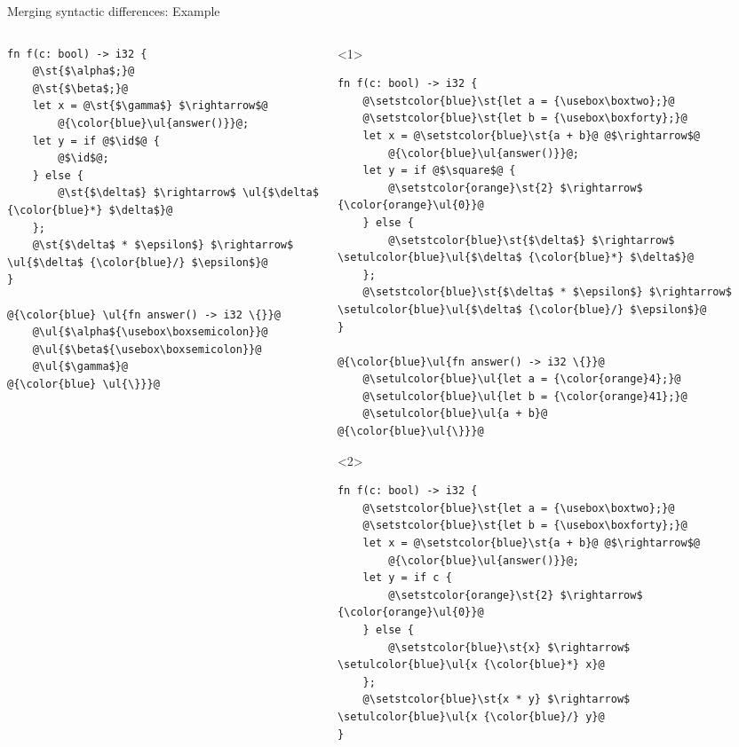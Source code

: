 \documentclass{beamer}
\makeatletter
\let\UL\ul
\renewcommand\ul{%
  \let\set@color\beamerorig@set@color
  \let\reset@color\beamerorig@reset@color
  \UL}
\let\ST\st
\renewcommand\st{%
  \let\set@color\beamerorig@set@color
  \let\reset@color\beamerorig@reset@color
  \ST}
\newcommand\id{\square}
\makeatother
\begin{document}
\begin{frame}[fragile]{Merging syntactic differences: Example}
\begin{columns}
\begin{column}{0.33\textwidth}
\newbox\boxsemicolon
\sbox\boxsemicolon{\color{blue}\scriptsize\ttfamily;}
\vspace{0.5em}
\begin{lstlisting}[rulecolor=\color{blue!20}]
fn f(c: bool) -> i32 {
    @\st{$\alpha$;}@
    @\st{$\beta$;}@
    let x = @\st{$\gamma$} $\rightarrow$@
        @{\color{blue}\ul{answer()}}@;
    let y = if @$\id$@ {
        @$\id$@;
    } else {
        @\st{$\delta$} $\rightarrow$ \ul{$\delta$ {\color{blue}*} $\delta$}@
    };
    @\st{$\delta$ * $\epsilon$} $\rightarrow$ \ul{$\delta$ {\color{blue}/} $\epsilon$}@
}

@{\color{blue} \ul{fn answer() -> i32 \{}}@
    @\ul{$\alpha${\usebox\boxsemicolon}}@
    @\ul{$\beta${\usebox\boxsemicolon}}@
    @\ul{$\gamma$}@
@{\color{blue} \ul{\}}}@
\end{lstlisting}
\end{column}
\begin{column}{0.33\textwidth}
\newbox\boxtwo
\sbox\boxtwo{\setulcolor{orange}\setul{-.75ex}{}\ul{\scriptsize\ttfamily 2}}
\newbox\boxforty
\sbox\boxforty{\setulcolor{orange}\setul{-.75ex}{}\ul{\scriptsize\ttfamily 40}}
\vspace{0.5em}
\begin{onlyenv}<1>
\begin{lstlisting}
fn f(c: bool) -> i32 {
    @\setstcolor{blue}\st{let a = {\usebox\boxtwo};}@
    @\setstcolor{blue}\st{let b = {\usebox\boxforty};}@
    let x = @\setstcolor{blue}\st{a + b}@ @$\rightarrow$@
        @{\color{blue}\ul{answer()}}@;
    let y = if @$\square$@ {
        @\setstcolor{orange}\st{2} $\rightarrow$ {\color{orange}\ul{0}}@
    } else {
        @\setstcolor{blue}\st{$\delta$} $\rightarrow$ \setulcolor{blue}\ul{$\delta$ {\color{blue}*} $\delta$}@
    };
    @\setstcolor{blue}\st{$\delta$ * $\epsilon$} $\rightarrow$ \setulcolor{blue}\ul{$\delta$ {\color{blue}/} $\epsilon$}@
}

@{\color{blue}\ul{fn answer() -> i32 \{}}@
    @\setulcolor{blue}\ul{let a = {\color{orange}4};}@
    @\setulcolor{blue}\ul{let b = {\color{orange}41};}@
    @\setulcolor{blue}\ul{a + b}@
@{\color{blue}\ul{\}}}@
\end{lstlisting}
\end{onlyenv}%
\begin{onlyenv}<2>
\begin{lstlisting}
fn f(c: bool) -> i32 {
    @\setstcolor{blue}\st{let a = {\usebox\boxtwo};}@
    @\setstcolor{blue}\st{let b = {\usebox\boxforty};}@
    let x = @\setstcolor{blue}\st{a + b}@ @$\rightarrow$@
        @{\color{blue}\ul{answer()}}@;
    let y = if c {
        @\setstcolor{orange}\st{2} $\rightarrow$ {\color{orange}\ul{0}}@
    } else {
        @\setstcolor{blue}\st{x} $\rightarrow$ \setulcolor{blue}\ul{x {\color{blue}*} x}@
    };
    @\setstcolor{blue}\st{x * y} $\rightarrow$ \setulcolor{blue}\ul{x {\color{blue}/} y}@
}


\end{lstlisting}
\end{onlyenv}
\end{column}
\end{columns}
\end{frame}
\end{document}
